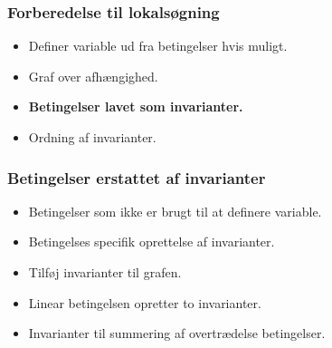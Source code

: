 \documentclass[12pt]{beamer}
\begin{document}
\begin{frame}
\frametitle{Forberedelse til lokalsøgning}
\begin{itemize}
\item Definer variable ud fra betingelser hvis muligt.
\item Graf over afhængighed.
\item \textbf{Betingelser lavet som invarianter.}
\item Ordning af invarianter.
\end{itemize}
\end{frame}

 \begin{frame}
 \frametitle{Betingelser erstattet af invarianter}
 \begin{itemize}[<+->]
  \item Betingelser som ikke er brugt til at definere variable. 
  \item Betingelses specifik oprettelse af invarianter.
  \item Tilføj invarianter til grafen. 
  \item Linear betingelsen opretter to invarianter.
  \item Invarianter til summering af overtrædelse betingelser.
\end{itemize}
 
 \end{frame}


\end{document}
